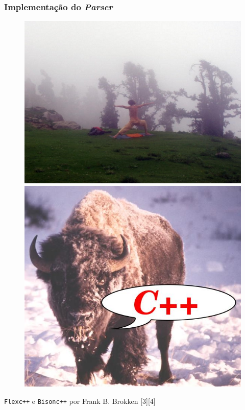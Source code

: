\documentclass[brazil]{beamer}
\begin{document}
\begin{frame}[fragile]
  \frametitle{Implementação do \textit{Parser}}
  \pause
  \vspace{-1em}
  \begin{figure}
    \includegraphics[width=.4\textwidth]{images/flex.jpg}
    \pause
    \includegraphics[width=.4\textwidth]{images/bison.jpg}
  \end{figure}
  \pause
  \begin{center}
    \texttt{Flexc++} e \texttt{Bisonc++} por Frank B. Brokken [3][4]
  \end{center}
\end{frame}
\end{document}
